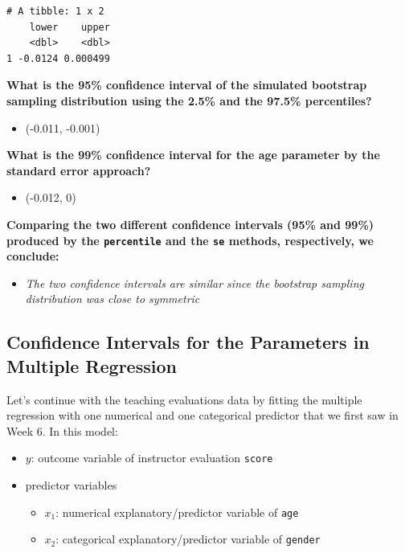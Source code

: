 \documentclass[]{article}
\providecommand{\tightlist}{%
  \setlength{\itemsep}{0pt}\setlength{\parskip}{0pt}}
\begin{document}
\begin{verbatim}
# A tibble: 1 x 2
    lower    upper
    <dbl>    <dbl>
1 -0.0124 0.000499
\end{verbatim}

\textbf{What is the 95\% confidence interval of the simulated bootstrap
sampling distribution using the 2.5\% and the 97.5\% percentiles?}

\begin{itemize}
\tightlist
\item
  (-0.011, -0.001)
\end{itemize}

\textbf{What is the 99\% confidence interval for the age parameter by
the standard error approach?}

\begin{itemize}
\tightlist
\item
  (-0.012, 0)
\end{itemize}

\textbf{Comparing the two different confidence intervals (95\% and 99\%)
produced by the \texttt{percentile} and the \texttt{se} methods,
respectively, we conclude:}

\begin{itemize}
\tightlist
\item
  \emph{The two confidence intervals are similar since the bootstrap
  sampling distribution was close to symmetric}
\end{itemize}

\subsection{Confidence Intervals for the Parameters in Multiple
Regression}\label{confidence-intervals-for-the-parameters-in-multiple-regression}

Let's continue with the teaching evaluations data by fitting the
multiple regression with one numerical and one categorical predictor
that we first saw in Week 6. In this model:

\begin{itemize}
\tightlist
\item
  \(y\): outcome variable of instructor evaluation \texttt{score}
\item
  predictor variables

  \begin{itemize}
  \tightlist
  \item
    \(x_1\): numerical explanatory/predictor variable of \texttt{age}
  \item
    \(x_2\): categorical explanatory/predictor variable of
    \texttt{gender}
  \end{itemize}
\end{itemize}
\end{document}
